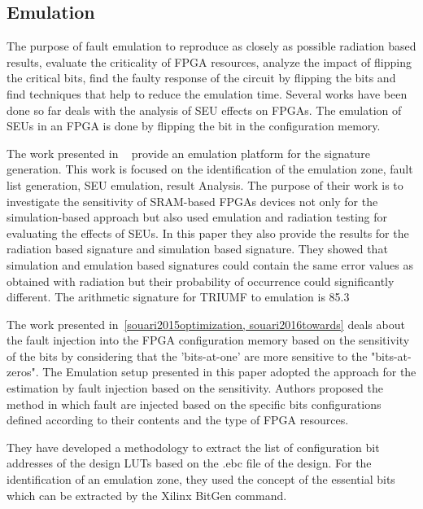 \subsection{Emulation}

The purpose of fault emulation to reproduce as closely as possible radiation based results, evaluate the criticality of FPGA resources, analyze the impact of flipping the critical bits, find the faulty response of the circuit by flipping the bits and find techniques that help to reduce the emulation time. Several works have been done so far deals with the analysis of SEU effects on FPGAs. The emulation of SEUs in an FPGA is done by flipping the bit in the configuration memory. 

The work presented in ~\cite{hobeika2014multi} provide an emulation platform for the signature generation. This work is focused on the identification of the emulation zone,  fault list generation, SEU emulation, result Analysis. The purpose of their work is to investigate the sensitivity of SRAM-based FPGAs devices not only for the simulation-based approach but also used emulation and radiation testing for evaluating the effects of SEUs. In this paper they also provide the results for the radiation based signature and simulation based signature. They showed that simulation and emulation based signatures could contain the same error values as obtained with radiation but their probability of occurrence could significantly different. The arithmetic signature for TRIUMF to emulation is 85.3 %

The work presented in~\ref{souari2015optimization, souari2016towards} deals about the fault injection into the FPGA configuration memory based on the sensitivity of the bits by considering that the 'bits-at-one' are more sensitive to the "bits-at-zeros". The Emulation setup presented in this paper adopted the approach for the estimation by fault injection based on the sensitivity. Authors proposed the method in which fault are injected based on the specific bits configurations defined according to their contents and the type of FPGA resources.



They have developed a methodology to extract the list of configuration bit addresses of the design LUTs based on the .ebc file of the design.  For the identification of an emulation zone, they used the concept of the essential bits which can be extracted by the Xilinx BitGen command.

